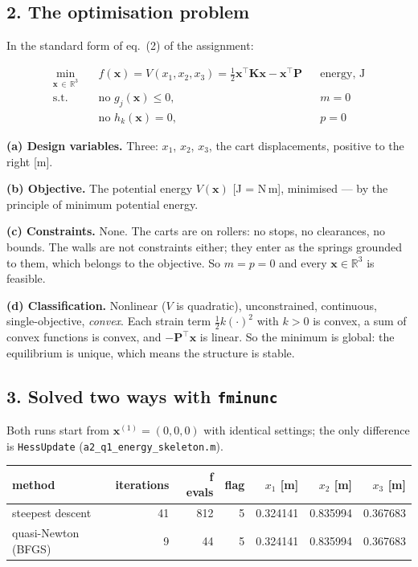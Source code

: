\documentclass[11pt,a4paper]{article}
\begin{document}
\subsection*{2. The optimisation problem}

In the standard form of eq.~(2) of the assignment:

\begin{align*}
  \min_{\bm{x}\,\in\,\mathbb{R}^3} \quad
  & f(\bm{x}) = V(x_1,x_2,x_3)
    = \tfrac12 \bm{x}^\top\bm{K}\bm{x} - \bm{x}^\top\bm{P}
  && \text{energy, J} \\
  \text{s.t.} \quad
  & \text{no } g_j(\bm{x}) \le 0, && m = 0 \\
  & \text{no } h_k(\bm{x}) = 0,   && p = 0
\end{align*}

\textbf{(a) Design variables.} Three: $x_1$, $x_2$, $x_3$, the cart
displacements, positive to the right [m].

\textbf{(b) Objective.} The potential energy $V(\bm{x})$ [J = N\,m], minimised
--- by the principle of minimum potential energy.

\textbf{(c) Constraints.} None. The carts are on rollers: no stops, no
clearances, no bounds. The walls are not constraints either; they enter as the
springs grounded to them, which belongs to the objective. So $m = p = 0$ and
every $\bm{x} \in \mathbb{R}^3$ is feasible.

\textbf{(d) Classification.} Nonlinear ($V$ is quadratic), unconstrained,
continuous, single-objective, \emph{convex}. Each strain term
$\tfrac12 k(\cdot)^2$ with $k > 0$ is convex, a sum of convex functions is
convex, and $-\bm{P}^\top\bm{x}$ is linear. So the minimum is global: the
equilibrium is unique, which means the structure is stable.

\subsection*{3. Solved two ways with \texttt{fminunc}}

\begin{sloppypar}
Both runs start from $\bm{x}^{(1)} = (0,0,0)$ with identical settings; the only
difference is \texttt{HessUpdate} (\texttt{a2\_q1\_energy\_skeleton.m}).
\end{sloppypar}

\begin{center}
\begin{tabular}{lrrrrrr}
\toprule
method & iterations & f evals & flag & $x_1$ [m] & $x_2$ [m] & $x_3$ [m] \\
\midrule
steepest descent & 41 & 812 & 5 & 0.324141 & 0.835994 & 0.367683 \\
quasi-Newton (BFGS) & 9 & 44 & 5 & 0.324141 & 0.835994 & 0.367683 \\
\bottomrule
\end{tabular}
\end{center}
\end{document}
